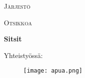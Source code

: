 \documentclass[8pt]{extbook}
\begin{document}
\raggedbottom
\begin{titlepage}
	\centering
	{\scshape\LARGE Järjestö \par}
	\vspace{1cm}
	{\scshape\Large Otsikkoa\par}
	\vspace{1.5cm}
	{\huge\bfseries Sitsit\par}


\end{titlepage}
Yhteistyössä:
\begin{figure}[h!]
\texttt{[image: apua.png]}
\end{figure}
\begin{multicols}{2}


\small



\printindex

\end{multicols}
\end{document}
